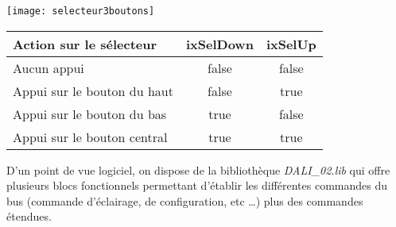 \begin{minipage}{0.15\linewidth}
    \texttt{[image: selecteur3boutons]}
\end{minipage}
\begin{minipage}{0.84\linewidth}
    \begin{center}
    \begin{tabular}{|l|c|c|}
        \hline
        \textbf{Action sur le sélecteur} & \textbf{ixSelDown} & \textbf{ixSelUp} \\
        \hline
        Aucun appui & false & false \\
        \hline
        Appui sur le bouton du haut & false & true \\
        \hline
        Appui sur le bouton du bas & true & false \\
        \hline
        Appui sur le bouton central & true & true \\
        \hline
    \end{tabular} 
\end{center}   
\end{minipage}
\begin{UPSTIactivite}
    \label{act:archi}
    \vspace{7cm}
\end{UPSTIactivite}

D’un point de vue logiciel, on dispose de la bibliothèque \textit{DALI\_02.lib} qui offre plusieurs blocs fonctionnels
permettant d’établir les différentes commandes du bus (commande d’éclairage, de configuration, etc …) plus des
commandes étendues.



